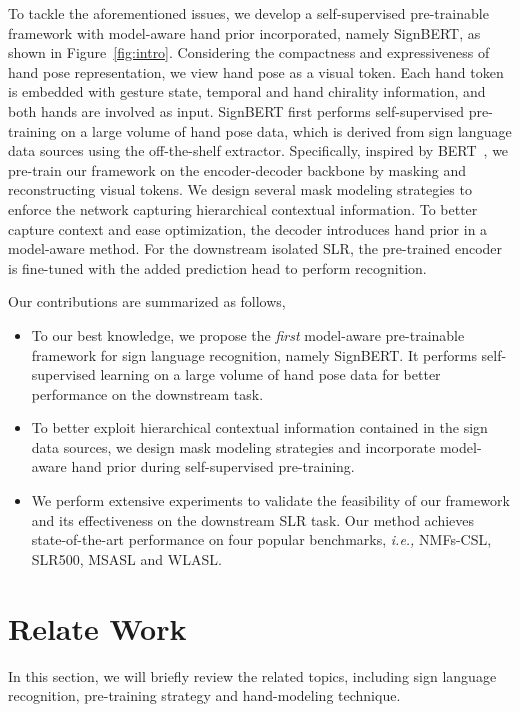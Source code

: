 \documentclass[10pt,twocolumn,letterpaper]{article}
\begin{document}
To tackle the aforementioned issues, we develop a self-supervised pre-trainable framework with model-aware hand prior incorporated, namely SignBERT, as shown in Figure~\ref{fig:intro}.
Considering the compactness and expressiveness of hand pose representation, we view hand pose as a visual token.
Each hand token is embedded with gesture state, temporal and hand chirality information, and both hands are involved as input.
SignBERT first performs self-supervised pre-training on a large volume of hand pose data, which is derived from sign language data sources using the off-the-shelf extractor.
Specifically, inspired by BERT~\cite{devlin2018bert}, we pre-train our framework on the encoder-decoder backbone by masking and reconstructing visual tokens.
We design several mask modeling strategies to enforce the network capturing hierarchical contextual information.
To better capture context and ease optimization, the decoder introduces hand prior in a model-aware method.
For the downstream isolated SLR, the pre-trained encoder is fine-tuned with the added prediction head to perform recognition.

Our contributions are summarized as follows,
\vspace{-0.26cm}
\begin{itemize}
\setlength{\itemsep}{0pt}
\setlength{\parsep}{0pt}
\setlength{\parskip}{0pt}
    \item To our best knowledge, we propose the \emph{first} model-aware pre-trainable framework for sign language recognition, namely SignBERT. 
    It performs self-supervised learning on a large volume of hand pose data for better performance on the downstream task.
    \item To better exploit hierarchical contextual information contained in the sign data sources, we design mask modeling strategies and incorporate model-aware hand prior during self-supervised pre-training.
    \item We perform extensive experiments to validate the feasibility of our framework and its effectiveness on the downstream SLR task.
    Our method achieves state-of-the-art performance on four popular benchmarks, \emph{i.e.,} NMFs-CSL, SLR500, MSASL and WLASL.
\end{itemize}
\vspace{-0.2cm}




\section{Relate Work}
In this section, we will briefly review the related topics, including sign language recognition, pre-training strategy and hand-modeling technique.
\end{document}
